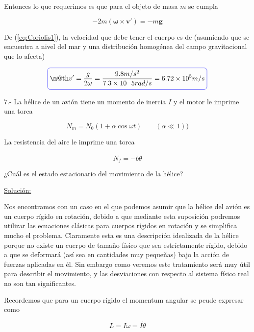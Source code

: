 \documentclass[a4paper,10pt]{article}
\makeatletter
\numberwithin{equation}{section}
\newcommand*{\boxcolor}{blue}
\renewcommand{\boxed}[1]{\textcolor{\boxcolor}{%
\tikz[baseline={([yshift=-1ex]current bounding box.center)}] \node [rectangle, minimum width=1ex,rounded corners,draw] {\normalcolor\m@th$\displaystyle#1$};}}
\makeatother
\begin{document}
\vspace{.3cm}

Entonces lo que requerimos es que para el objeto de masa $m$ se cumpla

\begin{equation}
 - 2m(\mathbf{\omega} \times \mathbf{v'}) = - m \mathbf{g}
 \label{eq:Coriolis1}
\end{equation}

De (\ref{eq:Coriolis1}), la velocidad que debe tener el cuerpo es de (asumiendo que se encuentra a nivel del mar
y una distribución homogénea del campo gravitacional que lo afecta)

\begin{equation}
 \boxed{ v' = \frac{g}{2\omega} = \frac{9.8 m/s^2}{7.3 \times 10^-5 rad/s} = 6.72 \times 10^5 m/s}
\end{equation}


\vspace{.3cm}

7.- La hélice de un avión tiene un momento de inercia $I$ y el motor le imprime una torca 

$$N_m = N_0 (1+\alpha \cos{\omega t}) \qquad (\alpha \ll 1))$$

La resistencia del aire le imprime una torca

$$N_f = -b\dot{\theta}$$

¿Cuál es el estado estacionario del movimiento de la hélice?

\vspace{.3cm}

\underline{Solución:}

Nos encontramos con un caso en el que podemos asumir que la hélice del avión es un
cuerpo rígido en rotación, debido a que mediante esta suposición podremos utilizar
las ecuaciones clásicas para cuerpos rígidos en rotación y se simplifica mucho el
problema. Claramente esta es una descripción idealizada de la hélice porque no 
existe un cuerpo de tamaño físico que sea estríctamente rígido, debido a que se
deformará (así sea en cantidades muy pequeñas) bajo la acción de fuerzas aplicadas
en él. Sin embargo como veremos este tratamiento será muy útil para describir el
movimiento, y las desviaciones con respecto al sistema físico real no son tan 
significantes.

Recordemos que para un cuerpo rígido el momentum angular se peude expresar como

\begin{equation}
 L = I\omega = I\dot{\theta}
 \label{eq:MomemtumAngCuerpoRig}
\end{equation}
\end{document}
